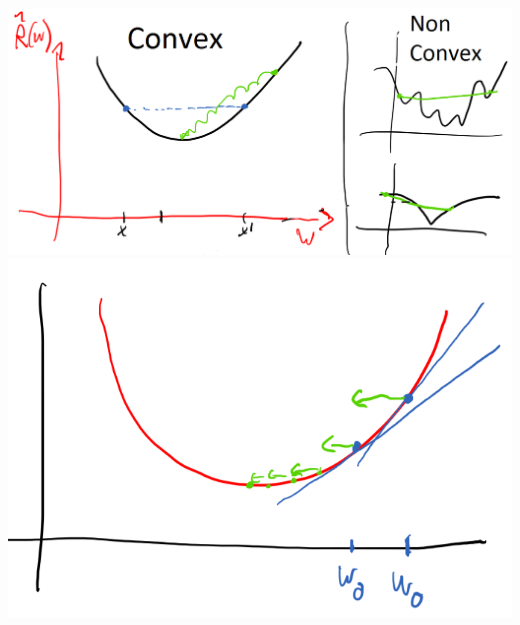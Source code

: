 \documentclass[a4paper, fontsize=8pt, landscape, DIV=1]{scrartcl}
\begin{document}
\begin{multicols*}{4}
		\includegraphics[width=\columnwidth]{images/Regression/convex_nonconvex.png}
		\includegraphics[width=\columnwidth]{images/Regression/gradient_descent.png}

\end{multicols*}
\end{document}
